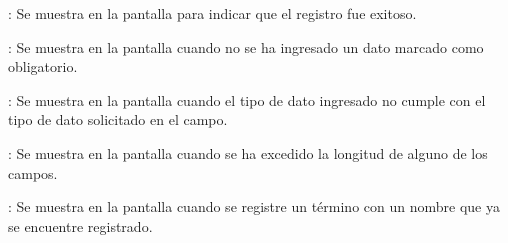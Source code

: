 \begin{Citemize}
	\item {}: Se muestra en la pantalla  para indicar que el registro fue exitoso.
	\item {}: Se muestra en la pantalla  cuando no se ha ingresado un dato marcado como obligatorio.
	\item {}: Se muestra en la pantalla  cuando el tipo de dato ingresado no cumple con el tipo de dato solicitado en el campo.
	\item {}: Se muestra en la pantalla  cuando se ha excedido la longitud de alguno de los campos.
	\item {}: Se muestra en la pantalla  cuando se registre un término con un nombre que ya se encuentre registrado.
\end{Citemize}
